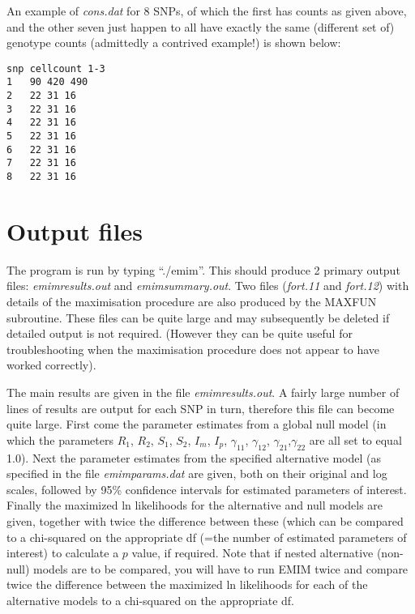 \documentclass[a4paper,11pt]{report}
\begin{document}
An example of {\it  cons.dat} for 8 SNPs, of which the first has counts as given above, and the other seven just happen to all have exactly the same (different set of) genotype counts (admittedly a contrived example!) is shown below:

\begin{verbatim}
snp	cellcount 1-3
1 	90 420 490
2 	22 31 16
3 	22 31 16
4 	22 31 16
5 	22 31 16
6 	22 31 16
7 	22 31 16
8 	22 31 16
\end{verbatim}
 
\bigskip


\newpage
\section*{Output files}


The program is run by typing ``./emim''. This should produce 2 primary output files: {\it emimresults.out} and {\it emimsummary.out}. Two files ({\it fort.11} and {\it fort.12})
with details of the maximisation procedure are also
produced by the MAXFUN subroutine. These files can be quite large and 
may subsequently be deleted if detailed output is not required.
(However they can be quite useful for troubleshooting when
the maximisation procedure does not appear to have worked correctly). 


The main results are given in the file {\it emimresults.out}. A fairly
large number of lines of results
are output for each SNP in turn, therefore this file can become
quite large. First come the parameter estimates
 from a global null model
(in which the parameters $R_1$, $R_2$, $S_1$, $S_2$, $I_m$, $I_p$, $\gamma_{11}$, $\gamma_{12}$, $\gamma_{21}$,$\gamma_{22}$ are all set to equal 1.0). 
Next  the parameter estimates
 from the specified alternative model (as specified in the file
{\it emimparams.dat} are given, both on their original and log scales,
followed by 95\% confidence intervals for estimated parameters of interest.
Finally the maximized ln likelihoods for the alternative and null
models are given, together with twice the difference between these
(which can be compared to a chi-squared on the appropriate df (=the number
of  estimated parameters of interest) to calculate a $p$ value, if required.
Note that if nested alternative (non-null) models are to be compared,
you will have to run EMIM twice and compare
twice the difference between the
maximized ln likelihoods for each of the alternative models
to a chi-squared on the appropriate df.
\end{document}
